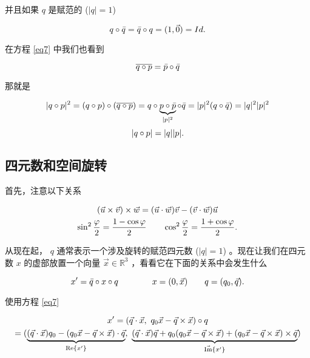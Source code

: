 并且如果 $q$ 是赋范的 ($|q|=1$)

\begin{equation}
q \circ \bar{q} = \bar{q} \circ q = (1, \vec{0}) = Id.
\label{eqConjN}
\end{equation}

在方程 \eqref{eq7} 中我们也看到 

\begin{equation}
\overline{q \circ p} = \bar{p} \circ \bar{q}
\label{eqQoQbar}
\end{equation}

那就是

\begin{equation*}
|q \circ p|^2 = (q\circ p) \circ (\overline{q \circ p}) = q\circ \underbrace{p \circ \bar{p}}_{|p|^2} \circ \bar{q} = |p|^2 (q\circ \bar{q}) = |q|^2|p|^2
\end{equation*}
\begin{equation}
|q \circ p|  = |q||p|.
\label{eqNormProd}
\end{equation}


\subsection{四元数和空间旋转}

首先，注意以下关系

\begin{gather*}
(\vec{u} \times \vec{v}) \times \vec{w} = (\vec{u} \cdot \vec{w}) \vec{v}   -   (\vec{v} \cdot \vec{w}) \vec{u} \\
\sin^2\frac{\varphi}{2} = \frac{1-\cos\varphi}{2}  \qquad    \cos^2\frac{\varphi}{2} = \frac{1+\cos\varphi}{2}.
\end{gather*}

从现在起， $q$ 通常表示一个涉及旋转的赋范四元数 ($|q|=1$) 。现在让我们在四元数 $x$ 的虚部放置一个向量 $\vec{x}\in \mathbb{R}^3$ ，看看它在下面的关系中会发生什么   

\begin{equation*}
x' = \bar{q} \circ x \circ q  \qquad \qquad   x = (0,\vec{x}) \qquad  q = (q_0, \vec{q}) .  
\end{equation*}

使用方程 \eqref{eq7}

\begin{gather*}
x' = (\vec{q} \cdot \vec{x},\  q_0 \vec{x} - \vec{q} \times \vec{x}) \circ q \\
= (  \underbrace{(\vec{q} \cdot \vec{x})q_0 - (q_0 \vec{x} - \vec{q} \times \vec{x}) \cdot \vec{q}}_{\textrm{Re}\{ x'  \}},\  
\underbrace{(\vec{q} \cdot \vec{x}) \vec{q} + q_0(q_0 \vec{x} - \vec{q} \times \vec{x}) +(q_0 \vec{x} - \vec{q} \times \vec{x}) \times \vec{q}}_{\vec{\textrm{Im}}\{  x' \}}  )
\end{gather*}


